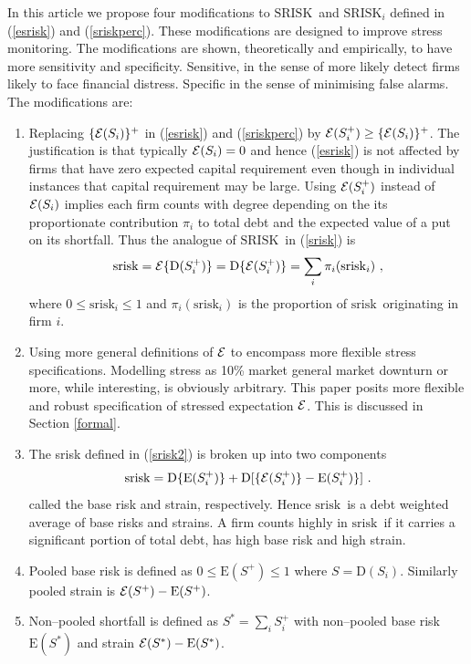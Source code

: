 \documentclass[authoryear]{elsarticle}
\newcommand{\E}{\mathrm{E}}
\newcommand{\Ex}{{\cal E}}
\newcommand{\Es}{\Ex}
\newcommand{\SR}{\ensuremath{\mathrm{SRISK}}}
\newcommand{\sr}{\ensuremath{\mathrm{srisk}}}
\newcommand{\eref}[1]{(\ref{#1})}
\newcommand{\sref}[1]{Section \ref{#1}}
\newcommand{\be}[1]{\begin{equation}\label{#1}}
\newcommand{\ee}{\end{equation}}
\newcommand{\D}{\mathrm{D}}
\begin{document}
In this article we propose four modifications to \SR\ and $\SR_i$ defined in \eref{esrisk} and \eref{sriskperc}.   These modifications are designed to improve stress monitoring.  The  modifications  are shown,  theoretically and empirically, to have more  sensitivity and specificity.   Sensitive, in the sense of more likely detect  firms likely to face financial distress.   Specific in the sense of   minimising false alarms.  The modifications are:
\begin{enumerate}
\item  Replacing $\{\Es(S_i)\} ^+$ in \eref{esrisk} and \eref{sriskperc} by $\Es(S_i^+)\ge\{\Es(S_i)\} ^+$. The justification is that typically $\Es(S_i)=0$ and  hence \eref{esrisk} is not affected by firms that  have zero expected capital requirement even though in individual instances that capital requirement may be large.   Using $\Ex(S^+_i)$ instead of $\Ex(S_i)$ implies each firm counts with degree depending on the its proportionate contribution $\pi_i$ to total debt and the expected value of a put on its shortfall.  Thus the analogue of \SR\  in \eref{srisk} is 
\be{srisk2}
\sr=\Ex\{\D(S_i^+)\} = \D\{\Ex(S_i^+)\} = \sum_i\pi_i(\sr_i)\ ,
\ee
where $0\le \sr_i\le 1$ and $\pi_i(\sr_i)$ is the proportion of \sr\ originating in firm $i$.
 
\item Using more general   definitions of $\Es$ to encompass more flexible stress specifications.   Modelling stress  as  10\% market general market downturn or more, while interesting, is obviously arbitrary.   This paper posits more flexible and robust specification of stressed expectation $\Ex$.   This is discussed in \sref{formal}.

\item The srisk defined in \eref{srisk2} is broken up into two components
\be{breakup}
\sr=\D\{\E(S_i^+)\}+\D[\{\Ex(S_i^+)\}-\E(S_i^+)\}]\ . 
\ee
called the base risk and strain, respectively.     Hence \sr\ is a debt weighted average of base risks and strains.       A firm counts highly in \sr\  if it carries a significant portion of total debt,  has high base risk and  high strain.  

\item Pooled base risk is defined as  $0\le\E(S^+)\le 1$ where $S=\D(S_i)$.  Similarly pooled strain is  
$\Ex(S^+)-\E(S^+)$.  

\item Non--pooled shortfall is defined as $S^*=\sum_iS_i^+$ with non--pooled base risk $\E(S^*)$ and strain $\Ex(S^*)-\E(S^*)$.  


\end{enumerate}
\end{document}

